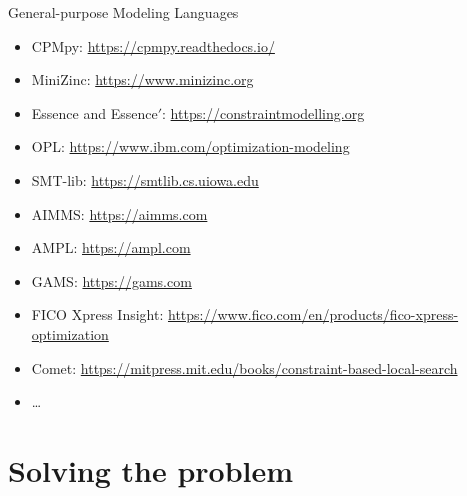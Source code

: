 \documentclass{cons-beamer}
\begin{document}
\begin{frame}{General-purpose Modeling Languages}
  \begin{itemize}
    \item CPMpy: \url{https://cpmpy.readthedocs.io/} \vfill
    \item MiniZinc: \url{https://www.minizinc.org} \vfill
    \item Essence and Essence$'$:
      \url{https://constraintmodelling.org} \vfill
    \item OPL: \url{https://www.ibm.com/optimization-modeling} \vfill
    \item SMT-lib: \url{https://smtlib.cs.uiowa.edu} \vfill
    \item AIMMS: \url{https://aimms.com} \vfill
    \item AMPL: \url{https://ampl.com} \vfill
    \item GAMS: \url{https://gams.com} \vfill
    \item FICO Xpress Insight: \small
      \url{https://www.fico.com/en/products/fico-xpress-optimization}
    \item Comet: \footnotesize
      \url{https://mitpress.mit.edu/books/constraint-based-local-search}
    \item \dots
  \end{itemize}
\end{frame}

\section{Solving the problem}
\end{document}
